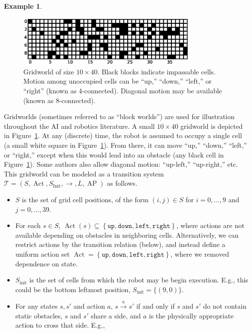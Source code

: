 \documentclass{amsart}
\DeclareMathOperator{\Act}{Act}
\DeclareMathOperator{\ap}{AP}
\theoremstyle{plain}
\theoremstyle{definition}
\theoremstyle{definition}
\newtheorem{examp}{Example}
\begin{document}
\begin{examp}
\begin{figure}
\includegraphics[width=9cm]{figures/illgridworld.eps}
\caption{Gridworld of size $10\times 40$.  Black blocks indicate impassable
  cells. Motion among unoccupied cells can be ``up,'' ``down,'' ``left,'' or
  ``right'' (known as 4-connected).  Diagonal motion may be available (known as
  8-connected).}
\label{fig:illgw}
\end{figure}
Gridworlds (sometimes referred to as ``block worlds'') are used for illustration
throughout the AI and robotics literature.  A small $10\times 40$ gridworld is
depicted in Figure~\ref{fig:illgw}.  At any (discrete) time, the robot is
assumed to occupy a single cell (a small white square in
Figure~\ref{fig:illgw}).  From there, it can move ``up,'' ``down,'' ``left,'' or
``right,'' except when this would lead into an obstacle (any black cell in
Figure~\ref{fig:illgw}).  Some authors also allow diagonal motion: ``up-left,''
``up-right,'' etc.  This gridworld can be modeled as a transition system
$\mathcal{T}=(S,\Act, S_{\mathrm{Init}}, \longrightarrow, L, \ap)$ as follows.
\begin{itemize}
\item $S$ is the set of grid cell positions, of the form $(i,j)\in S$ for $i=0,\ldots,9$ and $j=0,\ldots, 39$.
\item For each $s\in S$, $\Act(s) \subseteq \left\{ \mathtt{up}, \mathtt{down}, \mathtt{left}, \mathtt{right} \right\}$, where actions are not available depending on obstacles in neighboring cells.  Alternatively, we can restrict actions by the transition relation (below), and instead define a uniform action set $\Act = \left\{ \mathtt{up}, \mathtt{down}, \mathtt{left}, \mathtt{right} \right\}$, where we removed dependence on state.
\item $S_{\mathrm{init}}$ is the set of cells from which the robot may be begin execution.  E.g., this could be the bottom leftmost position, $S_{\mathrm{init}} = \{ (9,0) \}$.
\item For any states $s, s'$ and action $a$, $s \overset{a}{\longrightarrow} s'$ if and only if $s$ and $s'$ do not contain static obstacles, $s$ and $s'$ share a side, and $a$ is the physically appropriate action to cross that side.  E.g.,

\end{itemize}
\end{examp}
\end{document}
